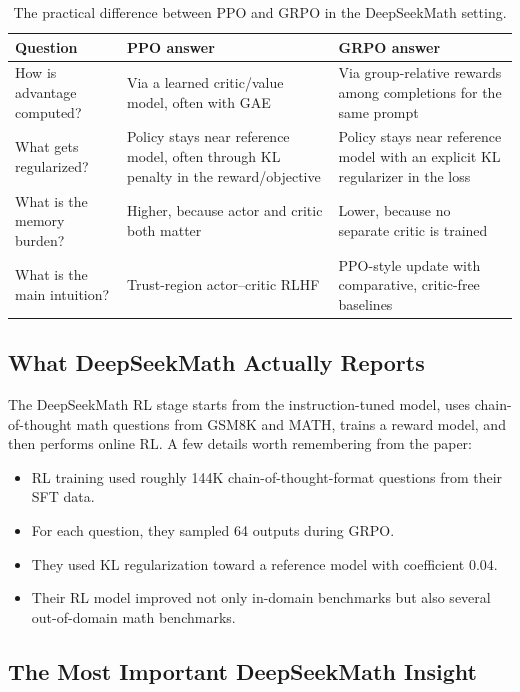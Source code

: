 \documentclass[11pt]{article}
\begin{document}
  \begin{table}[t]
  \centering
  \small
  \begin{tabularx}{\linewidth}{@{}lYY@{}}
  \toprule
  Question & PPO answer & GRPO answer \\
  \midrule
  How is advantage computed? & Via a learned critic/value model, often with GAE & Via group-relative rewards among completions for the same prompt \\
  What gets regularized? & Policy stays near reference model, often through KL penalty in the reward/objective & Policy stays near reference model with an explicit KL regularizer in the loss \\
  What is the memory burden? & Higher, because actor and critic both matter & Lower, because no separate critic is trained \\
  What is the main intuition? & Trust-region actor--critic RLHF & PPO-style update with comparative, critic-free baselines \\
  \bottomrule
  \end{tabularx}
  \caption{The practical difference between PPO and GRPO in the DeepSeekMath setting.}
  \end{table}

  \subsection{What DeepSeekMath Actually Reports}

  The DeepSeekMath RL stage starts from the instruction-tuned model, uses chain-of-thought math questions from GSM8K and MATH, trains a reward model, and then performs online RL. A few details worth remembering from the paper:\cite{deepseekmath}

  \begin{itemize}
    \item RL training used roughly 144K chain-of-thought-format questions from their SFT data.
    \item For each question, they sampled 64 outputs during GRPO.
    \item They used KL regularization toward a reference model with coefficient $0.04$.
    \item Their RL model improved not only in-domain benchmarks but also several out-of-domain math benchmarks.
  \end{itemize}

  \subsection{The Most Important DeepSeekMath Insight}
\end{document}
